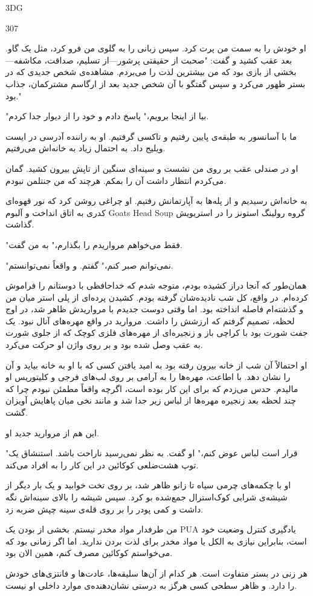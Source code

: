 3DG

307

او خودش را به سمت من پرت کرد. سپس زبانی را به گلوی من فرو کرد، مثل یک گاو. بعد عقب کشید و گفت: "صحبت از حقیقتی پرشور—از تسلیم، صداقت، مکاشفه—بخشی از بازی بود که من بیشترین لذت را می‌بردم. مشاهده‌ی شخص جدیدی که در بستر ظهور می‌کرد و سپس گفتگو با آن شخص جدید بعد از ارگاسم مشترکمان، جذاب بود." 

"بیا از اینجا برویم،" پاسخ دادم و خود را از دیوار جدا کردم.

ما با آسانسور به طبقه‌ی پایین رفتیم و تاکسی گرفتیم. او به راننده آدرسی در ایست ویلیج داد. به احتمال زیاد به خانه‌اش می‌رفتیم.

او در صندلی عقب بر روی من نشست و سینه‌ای سنگین از تاپش بیرون کشید. گمان می‌کردم انتظار داشت آن را بمکم. هرچند که من جنتلمن نبودم.

به خانه‌اش رسیدیم و از پله‌ها به آپارتمانش رفتیم. او چراغی روشن کرد که نور قهوه‌ای کدری به اتاق انداخت و آلبوم Goats Head Soup گروه رولینگ استونز را در استریویش گذاشت.

"فقط می‌خواهم مرواریدم را بگذارم،" به من گفت.

"نمی‌توانم صبر کنم،" گفتم. و واقعاً نمی‌توانستم.

همان‌طور که آنجا دراز کشیده بودم، متوجه شدم که خداحافظی با دوستانم را فراموش کرده‌ام. در واقع، کل شب نادیده‌شان گرفته بودم. کشیدن پرده‌ای از پلی استر میان من و گذشته‌ام فاصله انداخته بود. اما وقتی دوست جدیدم با مرواریدش ظاهر شد، در اوج لحظه، تصمیم گرفتم که ارزشش را داشت. مروارید در واقع مهره‌های آنال نبود. یک جفت شورت بود با کراچی باز و زنجیره‌ای از مهره‌های فلزی کوچک که از جلوی شورت به عقب وصل شده بود و بر روی واژن او حرکت می‌کرد.

او احتمالاً آن شب از خانه بیرون رفته بود به امید یافتن کسی که با او به خانه بیاید و آن را نشان دهد. با اطاعت، مهره‌ها را به آرامی بر روی لب‌های فرجی و کلیتوریس او مالیدم. حدس می‌زدم که برای این کار بوده است، اگرچه واقعاً مطمئن نبودم چرا که چند لحظه بعد زنجیره مهره‌ها از لباس زیر جدا شد و مانند نخی میان پاهایش آویزان گشت.

این هم از مروارید جدید او.

"قرار است لباس عوض کنم،" او گفت. به نظر نمی‌رسید ناراحت باشد. استنشاق یک توپ هشت‌ضلعی کوکائین در این کار را به افراد می‌کند.

او با چکمه‌های چرمی سیاه تا زانو ظاهر شد، بر روی تخت خوابید و یک بار دیگر از شیشه‌ی شرابی کوک‌استرال جمع‌شده بو کرد. سپس شیشه را بالای سینه‌اش نگه داشت و کمی پودر را بر روی قله‌ی سینه چپش ضربه زد.

من طرفدار مواد مخدر نیستم. بخشی از بودن یک PUA یادگیری کنترل وضعیت خود است، بنابراین نیازی به الکل یا مواد مخدر برای لذت بردن ندارید. اما اگر زمانی بود که می‌خواستم کوکائین مصرف کنم، همین الان بود.

هر زنی در بستر متفاوت است. هر کدام از آن‌ها سلیقه‌ها، عادت‌ها و فانتزی‌های خودش را دارد. و ظاهر سطحی کسی هرگز به درستی نشان‌دهنده‌ی موارد داخلی او نیست.